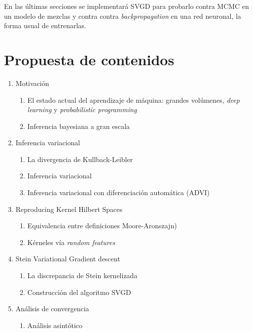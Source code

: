\documentclass[11pt]{article}
\begin{document}
En las últimas secciones se implementará SVGD para probarlo contra MCMC en un
modelo de mezclas y contra contra \textit{backpropagation} en una red neuronal,
la forma usual de entrenarlas.
\section{Propuesta de contenidos}
\begin{enumerate}
	\item Motivación
	\begin{enumerate}[label=1.\arabic*]
\item El estado actual del aprendizaje de máquina:  grandes volúmenes,
\textit{deep learning} y \textit{probabilistic programming}
		\item Inferencia bayesiana a gran escala
	\end{enumerate}
	\item Inferencia variacional
	\begin{enumerate}[label=2.\arabic*]
		\item La divergencia de Kullback-Leibler
		\item Inferencia variacional \cite{vi}
\item Inferencia variacional con diferenciación automática (ADVI)
\cite{Kucukelbir2016}
	\end{enumerate}
	\item Reproducing Kernel Hilbert Spaces \cite{Berlinet2009}
	\begin{enumerate}[label=3.\arabic*]
\item Equivalencia entre definiciones %
Moore-Aronszajn)
		\item Kérneles vía \textit{random features} \cite{Rahimi}
	\end{enumerate}
	\item Stein Variational Gradient descent
	\begin{enumerate}[label=4.\arabic*]
\item La discrepancia de Stein kernelizada \cite{kernelized-stein-discrepancy,
measuring-quality}
		\item Construcción del algoritmo SVGD \cite{svgd}
	\end{enumerate}
	\item Análisis de convergencia 
	\begin{enumerate}[label=5.\arabic*]
		\item Análisis asintótico \cite{svgd-gradient-flow}
		\begin{enumerate}[label=5.1.\arabic*]

\end{enumerate}
\end{enumerate}
\end{enumerate}
\end{document}
